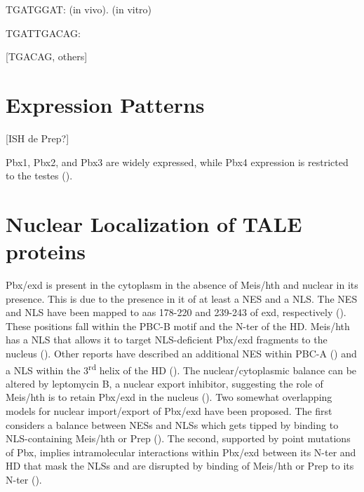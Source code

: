 TGATGGAT: \cite{Poepperl1995,Chan1997} (in vivo). \cite{Chang1997} (in vitro)

TGATTGACAG: \cite{Knoepfler1997}

[TGACAG, others]





\section{Expression Patterns}

[ISH de Prep?]

Pbx1, Pbx2, and Pbx3 are widely expressed,
while Pbx4 expression is restricted to the testes
(\cite{Monica1991, Wagner2001}).


\section{Nuclear Localization of TALE proteins}
\label{sec:nuclearLoc}

Pbx/exd is present in the cytoplasm in the absence of Meis/hth and nuclear in its presence. This is due to the presence in it of at least a \ac{NES} and a \ac{NLS}. The \ac{NES} and \ac{NLS} have been mapped to \acp{aa} 178-220 and 239-243 of exd, respectively (\cite{Abu-Shaar1999}). These positions fall within the PBC-B motif and the \ac{N-ter} of the \ac{HD}. Meis/hth has a \ac{NLS} that allows it to target \ac{NLS}-deficient Pbx/exd fragments to the nucleus (\cite{Abu-Shaar1999}). Other reports have described an additional \ac{NES} within PBC-A (\cite{Berthelsen1999}) and a \ac{NLS} within the 3\textsuperscript{rd} helix of the \ac{HD} (\cite{Saleh2000}). The nuclear/cytoplasmic balance can be altered by leptomycin B, a nuclear export inhibitor, suggesting the role of Meis/hth is to retain Pbx/exd in the nucleus (\cite{Berthelsen1999, Abu-Shaar1999}). Two somewhat overlapping models for nuclear import/export of Pbx/exd have been proposed. The first considers a balance between \acp{NES} and \acp{NLS} which gets tipped by binding to \ac{NLS}-containing Meis/hth or Prep (\cite{Affolter1999}). The second, supported by point mutations of Pbx, implies intramolecular interactions within Pbx/exd between its \ac{N-ter} and \ac{HD} that mask the \acp{NLS} and are disrupted by binding of Meis/hth or Prep to its \ac{N-ter} (\cite{Saleh2000}).


